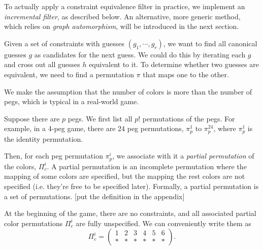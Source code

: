 To actually apply a constraint equivalence filter in practice, we implement an \emph{incremental filter}, as described below. An alternative, more generic method, which relies on \emph{graph automorphism}, will be introduced in the next section.

Given a set of constraints with guesses $(g_1,\cdots,g_r)$, we want to find all canonical guesses $g$ as candidates for the next guess. We could do this by iterating each $g$ and cross out all guesses $h$ equivalent to it. To determine whether two guesses are equivalent, we need to find a permutation $\pi$ that maps one to the other.

We make the assumption that the number of colors is more than the number of pegs, which is typical in a real-world game.

Suppose there are $p$ pegs. We first list all $p!$ permutations of the pegs. For example, in a 4-peg game, there are 24 peg permutations, $\pi_p^1$ to $\pi_p^{24}$, where $\pi_p^1$ is the identity permutation.

Then, for each peg permutation $\pi_p^i$, we associate with it a \emph{partial permutation} of the colors, $\Pi_c^i$. A partial permutation is an incomplete permutation where the mapping of some colors are specified, but the mapping the rest colors are not specified (i.e. they're free to be specified later). Formally, a partial permutation is a set of permutations. [put the definition in the appendix]

At the beginning of the game, there are no constraints, and all associated partial color permutations $\Pi_c^i$ are fully unspecified. We can conveniently write them as
\[
\Pi_c^i = 
\begin{pmatrix}
1 & 2 & 3 & 4 & 5 & 6 \\
* & * & * & * & * & * 
\end{pmatrix} .
\]


